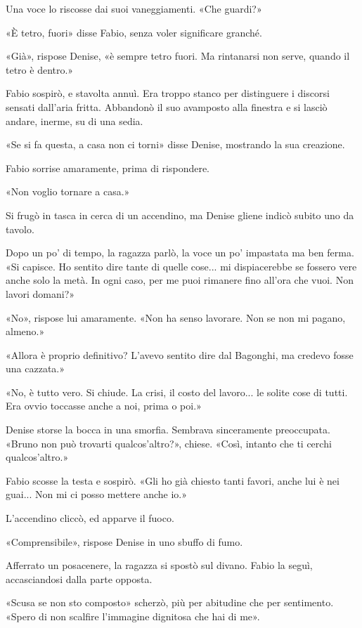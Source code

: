 Una voce lo riscosse dai suoi vaneggiamenti. «Che guardi?»

«È tetro, fuori» disse Fabio, senza voler significare granché.

«Già», rispose Denise, «è sempre tetro fuori. Ma rintanarsi non serve, quando il tetro è dentro.»

Fabio sospirò, e stavolta annuì. Era troppo stanco per distinguere i discorsi sensati dall'aria fritta. Abbandonò il suo avamposto alla finestra e si lasciò andare, inerme, su di una sedia.

«Se si fa questa, a casa non ci torni» disse Denise, mostrando la sua creazione.

Fabio sorrise amaramente, prima di rispondere.

«Non voglio tornare a casa.»

Si frugò in tasca in cerca di un accendino, ma Denise gliene indicò subito uno da tavolo.

Dopo un po' di tempo, la ragazza parlò, la voce un po' impastata ma ben ferma. «Si capisce. Ho sentito dire tante di quelle cose... mi dispiacerebbe se fossero vere anche solo la metà. In ogni caso, per me puoi rimanere fino all'ora che vuoi. Non lavori domani?»

«No», rispose lui amaramente. «Non ha senso lavorare. Non se non mi pagano, almeno.»

«Allora è proprio definitivo? L'avevo sentito dire dal Bagonghi, ma credevo fosse una cazzata.»

«No, è tutto vero. Si chiude. La crisi, il costo del lavoro... le solite cose di tutti. Era ovvio toccasse anche a noi, prima o poi.»

Denise storse la bocca in una smorfia. Sembrava sinceramente preoccupata. «Bruno non può trovarti qualcos'altro?», chiese. «Così, intanto che ti cerchi qualcos'altro.»

Fabio scosse la testa e sospirò. «Gli ho già chiesto tanti favori, anche lui è nei guai... Non mi ci posso mettere anche io.»

L'accendino cliccò, ed apparve il fuoco.

«Comprensibile», rispose Denise in uno sbuffo di fumo.

Afferrato un posacenere, la ragazza si spostò sul divano. Fabio la seguì, accasciandosi dalla parte opposta.

«Scusa se non sto composto» scherzò, più per abitudine che per sentimento. «Spero di non scalfire l'immagine dignitosa che hai di me».

